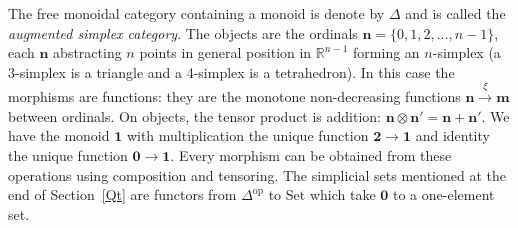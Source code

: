 \documentclass[a4paper,12pt]{article}
\theoremstyle{step}
\newcommand{\xra}{\xrightarrow}
\def\ot{{\otimes}}
\begin{document}
The free monoidal category containing a monoid is denote by $\Delta$ and is called the 
{\em augmented simplex category}. The objects are the ordinals $\mathbf{n} = \{0, 1, 2, \dots , n-1\}$, each
$\mathbf{n}$ abstracting $n$ points in general position in $\mathbb{R}^{n-1}$ forming an $n$-simplex
(a 3-simplex is a triangle and a 4-simplex is a tetrahedron). In this case the morphisms are functions: 
they are the monotone non-decreasing functions
$\mathbf{n}\xra{\xi}\mathbf{m}$ between ordinals. On objects, the tensor product is addition: 
$\mathbf{n}\ot \mathbf{n'} = \mathbf{n}+ \mathbf{n'}$. We have the monoid $\mathbf{1}$ with
multiplication the unique function $\mathbf{2}\to \mathbf{1}$ and identity the unique function
 $\mathbf{0}\to \mathbf{1}$. Every morphism can be obtained from these 
 operations using composition and tensoring. The simplicial sets mentioned at the end of Section~\ref{Qt}
 are functors from $\Delta^{\mathrm{op}}$ to $\mathrm{Set}$ which take $\mathbf{0}$ to a
 one-element set.  
 
\end{document}
